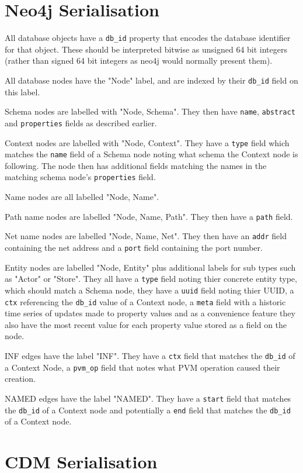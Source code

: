 \documentclass[12pt,twoside,a4paper]{article}
\newcommand{\field}[1]{\texttt{#1}}
\begin{document}
\section{Neo4j Serialisation}
\label{app:enc:neo4j}

All database objects have a \field{db\_id} property that encodes the database identifier for that object. These should be interpreted bitwise as unsigned 64 bit integers (rather than signed 64 bit integers as neo4j would normally present them).

All database nodes have the "Node" label, and are indexed by their \field{db\_id} field on this label.

Schema nodes are labelled with "Node, Schema". They then have \field{name}, \field{abstract} and \field{properties} fields as described earlier.

Context nodes are labelled with "Node, Context". They have a \field{type} field which matches the \field{name} field of a Schema node noting what schema the Context node is following. The node then has additional fields matching the names in the matching schema node's \field{properties} field.

Name nodes are all labelled "Node, Name".

Path name nodes are labelled "Node, Name, Path". They then have a \field{path} field.

Net name nodes are labelled "Node, Name, Net". They then have an \field{addr} field containing the net address and a \field{port} field containing the port number.

Entity nodes are labelled "Node, Entity" plus additional labels for sub types such as "Actor" or "Store". They all have a \field{type} field noting thier concrete entity type, which should match a Schema node, they have a \field{uuid} field noting thier UUID, a \field{ctx} referencing the \field{db\_id} value of a Context node, a \field{meta} field with a historic time series of updates made to property values and as a convenience feature they also have the most recent value for each property value stored as a field on the node.

INF edges have the label "INF". They have a \field{ctx} field that matches the \field{db\_id} of a Context Node, a \field{pvm\_op} field that notes what PVM operation caused their creation.

NAMED edges have the label "NAMED". They have a \field{start} field that matches the \field{db\_id} of a Context node and potentially a \field{end}
 field that matches the \field{db\_id} of a Context node.

\section{CDM Serialisation}
\label{app:enc:cdm}
\end{document}
